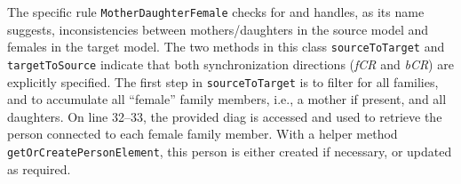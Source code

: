 The specific rule \texttt{Mother\-Daughter\-Female} checks for and handles, as its name suggests, inconsistencies between mothers/daughters in the source model and females in the target model.
The two methods in this class \texttt{source\-To\-Target} and \texttt{target\-To\-Source} indicate that both synchronization directions (\emph{fCR} and \emph{bCR}) are explicitly specified.
The first step in \texttt{source\-To\-Target} is to filter for all families, and to accumulate all ``female'' family members, i.e., a mother if present, and all daughters.
On line 32--33, the provided diag is accessed and used to retrieve the person connected to each female family member.
With a helper method \texttt{get\-Or\-Create\-Person\-Element}, this person is either created if necessary, or updated as required.

